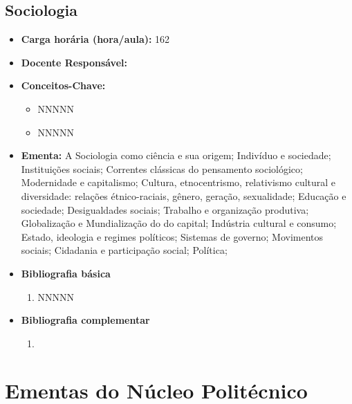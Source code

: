 \documentclass[11pt,fleqn]{book} %
\begin{document}
\subsection{Sociologia}\label{disc:sociologia}
\begin{itemize}
	\item \textbf{Carga horária (hora/aula):} 162
	\item \textbf{Docente Responsável:}
	\item \textbf{Conceitos-Chave:}
	\begin{itemize}
		\item NNNNN
		\item NNNNN
	\end{itemize}
	\item \textbf{Ementa:} A Sociologia como ciência e sua origem; 
	Indivíduo e sociedade; 
	Instituições sociais; 
	Correntes clássicas do pensamento sociológico; 
	Modernidade e capitalismo;
	Cultura, etnocentrismo, relativismo cultural e diversidade: relações étnico-raciais, gênero, geração, sexualidade;
	Educação e sociedade; 
	Desigualdades sociais; 
	Trabalho e organização produtiva; 
	Globalização e Mundialização do do capital; 
	Indústria cultural e consumo;
	Estado, ideologia e regimes políticos; 
	Sistemas de governo; 
	Movimentos sociais;
	Cidadania e participação social;
	Política;
	\item \textbf{Bibliografia básica}
	\begin{enumerate}
		\item NNNNN
	\end{enumerate}
	\item \textbf{Bibliografia complementar}
	\begin{enumerate}
		\item 
	\end{enumerate}	
\end{itemize}


\newpage
\section{Ementas do Núcleo Politécnico}\label{ementasPolitecnico}


\newpage
\end{document}
